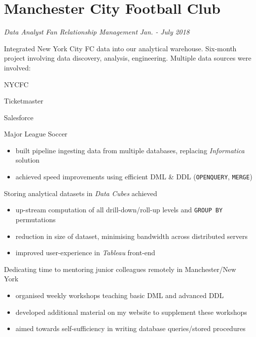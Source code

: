 \documentclass[../cv.tex]{subfiles}
\begin{document}
\section{Manchester City Football Club}
\textit{Data Analyst}
\hfill
\textit{Fan Relationship Management}
\hfill
\textit{Jan. - July 2018}

\begin{description}[style=multiline,leftmargin=3cm]
	\item[NYCFC Data Integration \textnormal{Project Owner}]

	      Integrated New York City FC  data into our analytical warehouse.
	      Six-month project involving data discovery, analysis, engineering.
	      Multiple data sources were involved:
	      \begin{itemize*}
		      \item NYCFC
		      \item Ticketmaster
		      \item Salesforce
		      \item Major League Soccer
	      \end{itemize*}
	      \begin{description}[style=multiline,leftmargin=2.5cm]
		      \item[Data Pipeline]
		            {
		            \begin{itemize}
			            \item built pipeline ingesting data from multiple databases, replacing \textit{Informatica} solution
			            \item achieved speed improvements using efficient DML \& DDL (\texttt{OPENQUERY}, \texttt{MERGE})
		            \end{itemize}
		            }

		      \item[Data Cubes]
		            Storing analytical datasets in \textit{Data Cubes} achieved
		            \begin{itemize}
			            \item up-stream computation of all drill-down/roll-up levels and \texttt{GROUP BY} permutations
			            \item reduction in size of dataset, minimising bandwidth across distributed servers
			            \item improved user-experience in \textit{Tableau} front-end
		            \end{itemize}

		      \item[Mentoring]
		            Dedicating time to mentoring junior colleagues remotely in Manchester/New York
		            \begin{itemize}
			            \item organised weekly workshops teaching basic DML and advanced DDL
			            \item developed additional material on my website to supplement these workshops
			            \item aimed towards self-sufficiency in writing database queries/stored procedures
		            \end{itemize}


\end{description}
\end{description}
\end{document}
